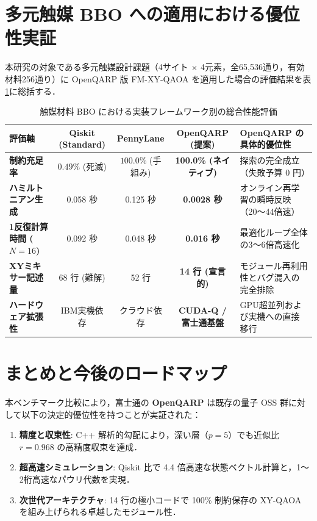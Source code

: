 \documentclass[11pt,a4paper]{ltjsarticle}
\begin{document}
\section{多元触媒 BBO への適用における優位性実証}

本研究の対象である多元触媒設計課題（4サイト $\times$ 4元素，全65,536通り，有効材料256通り）に OpenQARP 版 FM-XY-QAOA を適用した場合の評価結果を表\ref{tab:bbo_materials_summary}に総括する．

\begin{table}[H]
\centering
\small
\caption{触媒材料 BBO における実装フレームワーク別の総合性能評価}
\label{tab:bbo_materials_summary}
\vspace{1mm}
\begin{tabularx}{\textwidth}{lcccX}
\toprule
\textbf{評価軸} & \textbf{Qiskit (Standard)} & \textbf{PennyLane} & \textbf{OpenQARP (提案)} & \textbf{OpenQARP の具体的優位性} \\
\midrule
\textbf{制約充足率} & $0.49\%$ (死滅) & $100.0\%$ (手組み) & \textbf{100.0\% (ネイティブ)} & 探索の完全成立（失敗予算 0 円） \\
\textbf{ハミルトニアン生成} & 0.058 秒 & 0.125 秒 & \textbf{0.0028 秒} & オンライン再学習の瞬時反映（20〜44倍速） \\
\textbf{1反復計算時間 ($N=16$)} & 0.092 秒 & 0.048 秒 & \textbf{0.016 秒} & 最適化ループ全体の3〜6倍高速化 \\
\textbf{XYミキサー記述量} & 68 行 (難解) & 52 行 & \textbf{14 行 (宣言的)} & モジュール再利用性とバグ混入の完全排除 \\
\textbf{ハードウェア拡張性} & IBM実機依存 & クラウド依存 & \textbf{CUDA-Q / 富士通基盤} & GPU超並列および実機への直接移行 \\
\bottomrule
\end{tabularx}
\end{table}

\section{まとめと今後のロードマップ}

本ベンチマーク比較により，富士通の \textbf{OpenQARP} は既存の量子 OSS 群に対して以下の決定的優位性を持つことが実証された：
\begin{enumerate}\setlength{\itemsep}{1mm}
    \item \textbf{精度と収束性}: C++ 解析的勾配により，深い層（$p=5$）でも近似比 $r=0.968$ の高精度収束を達成．
    \item \textbf{超高速シミュレーション}: Qiskit 比で 4.4 倍高速な状態ベクトル計算と，1〜2桁高速なパウリ代数を実現．
    \item \textbf{次世代アーキテクチャ}: 14 行の極小コードで 100\% 制約保存の XY-QAOA を組み上げられる卓越したモジュール性．
\end{enumerate}
\end{document}
